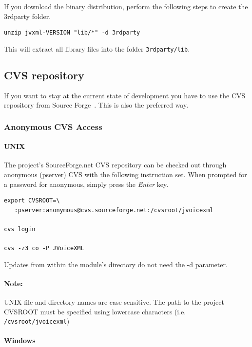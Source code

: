 \documentclass[11pt,a4paper]{article}
\begin{document}
If you download the binary distribution, perform the following steps
to create the 3rdparty folder.

\begin{lstlisting}
unzip jvxml-VERSION "lib/*" -d 3rdparty
\end{lstlisting}

This will extract all library files into the folder \texttt{3rdparty/lib}.

\subsection{CVS repository}
\label{sec:cvs-repository}

If you want to stay at the current state of development you have to use
the CVS repository from Source Forge~\cite{sourceforge}.
This is also the preferred way.

\subsubsection{Anonymous CVS Access}
\label{sec:anonymous-cvs-access}

\paragraph{UNIX}

The project's SourceForge.net CVS repository can be checked out through 
anonymous (pserver) CVS with the following instruction set. 
When prompted for a password for anonymous, simply press the \emph{Enter} key. 


\begin{lstlisting}
export CVSROOT=\
   :pserver:anonymous@cvs.sourceforge.net:/cvsroot/jvoicexml

cvs login
 
cvs -z3 co -P JVoiceXML
\end{lstlisting}

Updates from within the module's directory do not need the -d parameter.

\paragraph{Note:} UNIX file and directory names are case sensitive.
 The path to the project CVSROOT must be specified using lowercase characters 
(i.e. \texttt{/cvsroot/jvoicexml})

\paragraph{Windows}
\end{document}

